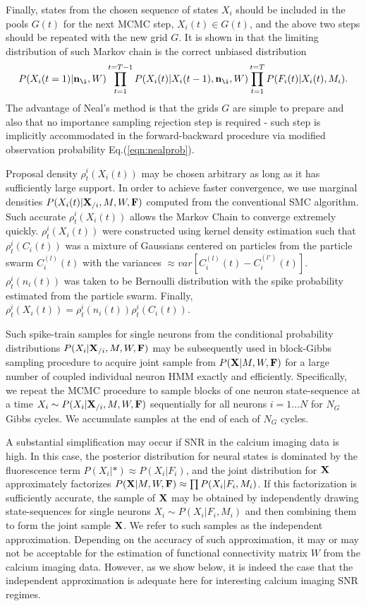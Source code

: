 \documentclass[amsmath,amssymb]{revtex4}
\begin{document}
Finally, states from the chosen sequence of states $X_i$ should be included in the pools $G(t)$ for the next MCMC step, $X_i(t)\in G(t)$, and the above two steps should be repeated with the new grid $G$. It is shown in \cite{NBR03} that the limiting distribution of such Markov chain is the correct unbiased distribution
\begin{equation}
P(X_i(t=1)|{\bf n}_{\i},W)\prod\limits_{t=1}^{t=T-1}P(X_i(t)|X_i(t-1),{\bf n}_{\i},W)\prod\limits_{t=1}^{t=T}P(F_i(t)|X_i(t),M_i).
\end{equation}
The advantage of Neal's method is that the grids $G$ are simple to prepare and also that no importance sampling rejection step is required - such step is implicitly accommodated in the forward-backward procedure via modified observation probability Eq.(\ref{eqn:nealprob}).

Proposal density $\rho^i_t(X_i(t))$ may be chosen arbitrary as long as it has sufficiently large support.
In order to achieve faster convergence, we use marginal densities $P(X_i(t)|{\bf X}_{/i},M,W,{\bf F})$ computed from the conventional SMC algorithm. Such accurate $\rho^i_t(X_i(t))$ allows the Markov Chain to converge extremely quickly.
$\rho^i_t(X_i(t))$ were constructed using kernel density estimation such that $\rho^i_t(C_i(t))$ was a mixture of Gaussians centered on particles from the particle swarm $C_i^{(l)}(t)$ with the variances $\approx var\left[C_i^{(l)}(t)-C_i^{(l')}(t)\right]$. $\rho^i_t(n_i(t))$ was taken to be Bernoulli distribution with the spike probability estimated from the particle swarm. Finally, $\rho^i_t(X_i(t))=\rho^i_t(n_i(t))\rho^i_t(C_i(t))$.

Such spike-train samples for single neurons from the conditional probability distributions $P(X_i|{\bf X}_{/i},M,W,{\bf F})$ may be subsequently used in block-Gibbs sampling procedure to acquire joint sample from $P({\bf X}|M,W,{\bf F})$ for a large number of coupled individual neuron HMM exactly and efficiently.
Specifically, we repeat the MCMC procedure to sample blocks of one neuron state-sequence at a time $X_i\sim P(X_{i}|{\bf X}_{/i},M,W,{\bf F})$ sequentially for all neurons $i=1\ldots N$ for $N_G$ Gibbs cycles. 
We accumulate samples at the end of each of $N_G$ cycles.

A substantial simplification may occur if SNR in the calcium imaging data is high. In this case, the posterior distribution for neural states is dominated by the fluorescence term $P(X_i|*)\approx P(X_i|F_i)$, and the joint distribution for ${\bf X}$ approximately factorizes $P({\bf X}|M,W,{\bf F})\approx\prod P(X_i|F_i,M_i)$. If this factorization is sufficiently accurate, the sample of ${\bf X}$ may be obtained by independently drawing state-sequences for single neurons $X_i \sim P(X_i|F_i,M_i)$ and then combining them to form the joint sample ${\bf X}$.  We refer to such samples as the independent approximation. Depending on the accuracy of such approximation, it may or may not be acceptable for the estimation of functional connectivity matrix $W$ from the calcium imaging data. However, as we show below, it is indeed the case that the independent approximation is adequate here for interesting calcium imaging SNR regimes.
\end{document}
